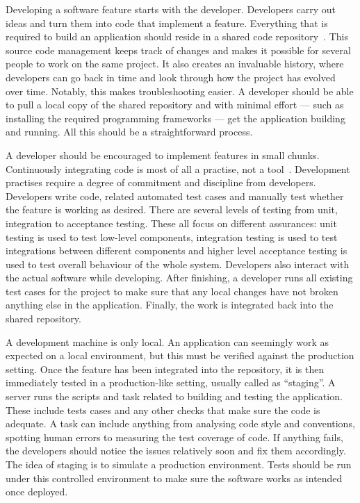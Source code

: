 \documentclass[english]{tktltiki2}
\begin{document}
Developing a software feature starts with the developer. Developers carry out ideas and turn them into code that implement a feature. Everything that is required to build an application should reside in a shared code repository~\cite{HF11}. This source code management keeps track of changes and makes it possible for several people to work on the same project. It also creates an invaluable history, where developers can go back in time and look through how the project has evolved over time. Notably, this makes troubleshooting easier. A developer should be able to pull a local copy of the shared repository and with minimal effort — such as installing the required programming frameworks — get the application building and running. All this should be a straightforward process.

A developer should be encouraged to implement features in small chunks. Continuously integrating code is most of all a practise, not a tool~\cite{HF11}. Development practises require a degree of commitment and discipline from developers. Developers write code, related automated test cases and manually test whether the feature is working as desired. There are several levels of testing from unit, integration to acceptance testing. These all focus on different assurances: unit testing is used to test low-level components, integration testing is used to test integrations between different components and higher level acceptance testing is used to test overall behaviour of the whole system. Developers also interact with the actual software while developing. After finishing, a developer runs all existing test cases for the project to make sure that any local changes have not broken anything else in the application. Finally, the work is integrated back into the shared repository.

A development machine is only local. An application can seemingly work as expected on a local environment, but this must be verified against the production setting. Once the feature has been integrated into the repository, it is then immediately tested in a production-like setting, usually called as “staging”. A server runs the scripts and task related to building and testing the application. These include tests cases and any other checks that make sure the code is adequate. A task can include anything from analysing code style and conventions, spotting human errors to measuring the test coverage of code. If anything fails, the developers should notice the issues relatively soon and fix them accordingly. The idea of staging is to simulate a production environment. Tests should be run under this controlled environment to make sure the software works as intended once deployed.
\end{document}
